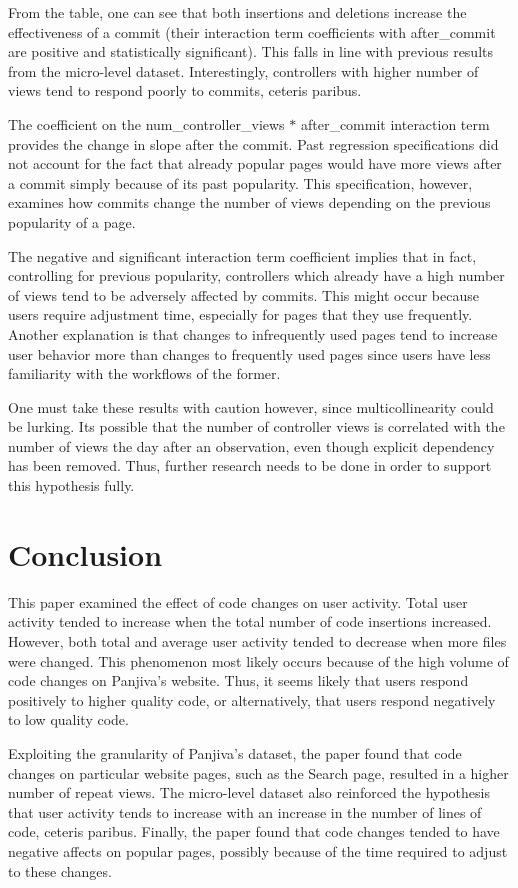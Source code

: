 \documentclass[10pt]{article}
\begin{document}
From the table, one can see that both insertions and deletions increase the effectiveness of a commit (their interaction term coefficients with after\_commit are positive and statistically significant). This falls in line with previous results from the micro-level dataset. Interestingly, controllers with higher number of views tend to respond poorly to commits, ceteris paribus. 

The coefficient on the num\_controller\_views $*$ after\_commit interaction term provides the change in slope after the commit. Past regression specifications did not account for the fact that already popular pages would have more views after a commit simply because of its past popularity. This specification, however, examines how commits change the number of views depending on the previous popularity of a page.

The negative and significant interaction term coefficient implies that in fact, controlling for previous popularity, controllers which already have a high number of views tend to be adversely affected by commits. This might occur because users require adjustment time, especially for pages that they use frequently. Another explanation is that changes to infrequently used pages tend to increase user behavior more than changes to frequently used pages since users have less familiarity with the workflows of the former.

One must take these results with caution however, since multicollinearity could be lurking. Its possible that the number of controller views is correlated with the number of views the day after an observation, even though explicit dependency has been removed. Thus, further research needs to be done in order to support this hypothesis fully.

\section{Conclusion}

This paper examined the effect of code changes on user activity. Total user activity tended to increase when the total number of code insertions increased. However, both total and average user activity tended to decrease when more files were changed. This phenomenon most likely occurs because of the high volume of code changes on Panjiva's website. Thus, it seems likely that users respond positively to higher quality code, or alternatively, that users respond negatively to low quality code. 

Exploiting the granularity of Panjiva's dataset, the paper found that code changes on particular website pages, such as the Search page, resulted in a higher number of repeat views. The micro-level dataset also reinforced the hypothesis that user activity tends to increase with an increase in the number of lines of code, ceteris paribus. Finally, the paper found that code changes tended to have negative affects on popular pages, possibly because of the time required to adjust to these changes.
\end{document}
